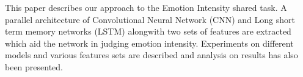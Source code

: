 This paper describes our approach to the Emotion Intensity shared task. A parallel architecture of Convolutional Neural Network (CNN) and Long short term memory networks (LSTM) alongwith two sets of features are extracted which aid the network in judging emotion intensity. Experiments on different models and various features sets are described and analysis on results has also been presented.
